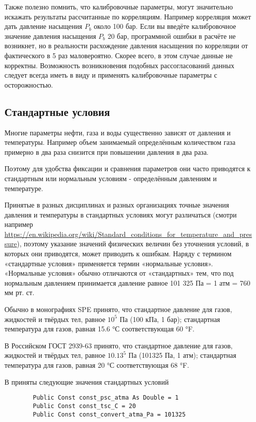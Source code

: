 Также полезно помнить, что калибровочные параметры, могут значительно искажать результаты рассчитанные по корреляциям. Например корреляция может дать давление насыщения $P_b$ около 100 бар. Если вы введёте калибровочное значение давления насыщения $P_b$ 20 бар, программной ошибки в расчёте не возникнет, но в реальности расхождение давления насыщения по корреляции от фактического в 5 раз маловероятно. Скорее всего, в этом случае данные не корректны. Возможность возникновения подобных рассогласований данных следует всегда иметь в виду и применять калибровочные параметры с осторожностью.  

\subsection{Стандартные условия} 
Многие параметры нефти, газа и воды существенно зависят от давления и температуры. Например объем занимаемый определённым количеством газа примерно в два раза снизится при повышении давления в два раза. 

Поэтому для удобства фиксации и сравнения параметров они часто приводятся к стандартным или нормальным условиям - определённым давлениям и температуре. 
	
	Принятые в разных дисциплинах и разных организациях точные значения давления и температуры в стандартных условиях могут различаться (смотри например \url{https://en.wikipedia.org/wiki/Standard_conditions_for_temperature_and_pressure}), поэтому указание значений физических величин без уточнения условий, в которых они приводятся, может приводить к ошибкам. Наряду с термином «стандартные условия» применяется термин «нормальные условия». «Нормальные условия» обычно отличаются от «стандартных» тем, что под нормальным давлением принимается давление равное 101 325 Па = 1 атм = 760 мм рт. ст.
	
	Обычно в монографиях SPE принято, что стандартное давление для газов, жидкостей и твёрдых тел, равное $10^5$ Па (100 кПа, 1 бар); стандартная температура для газов, равная 15.6 °С соответствующая 60 °F. 
	
	В Российском ГОСТ 2939-63  принято, что стандартное давление для газов, жидкостей и твёрдых тел, равное $10.13^5$ Па (101325 Па, 1 атм); стандартная температура для газов, равная 20 °С соответствующая 68 °F. 
	
	В \unf{} приняты следующие значения стандартных условий
	
	
	\begin{listing}[H]
		\begin{verbatim}
		Public Const const_psc_atma As Double = 1
		Public Const const_tsc_C = 20
		Public Const const_convert_atma_Pa = 101325
		\end{verbatim}
	\end{listing}

